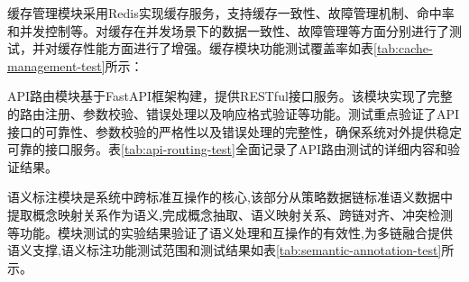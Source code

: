 缓存管理模块采用Redis实现缓存服务，支持缓存一致性、故障管理机制、命中率和并发控制等。对缓存在并发场景下的数据一致性、故障管理等方面分别进行了测试，并对缓存性能方面进行了增强。缓存模块功能测试覆盖率如表\ref{tab:cache-management-test}所示：

\begin{table}[H]
\centering
\caption{缓存管理模块单元测试结果}
\label{tab:cache-management-test}
\end{table}

API路由模块基于FastAPI框架构建，提供RESTful接口服务。该模块实现了完整的路由注册、参数校验、错误处理以及响应格式验证等功能。测试重点验证了API接口的可靠性、参数校验的严格性以及错误处理的完整性，确保系统对外提供稳定可靠的接口服务。表\ref{tab:api-routing-test}全面记录了API路由测试的详细内容和验证结果。

\begin{table}[H]
\centering
\caption{API路由模块单元测试结果}
\label{tab:api-routing-test}
\end{table}

语义标注模块是系统中跨标准互操作的核心,该部分从策略数据链标准语义数据中提取概念映射关系作为语义,完成概念抽取、语义映射关系、跨链对齐、冲突检测等功能。模块测试的实验结果验证了语义处理和互操作的有效性,为多链融合提供语义支撑,语义标注功能测试范围和测试结果如表\ref{tab:semantic-annotation-test}所示。

